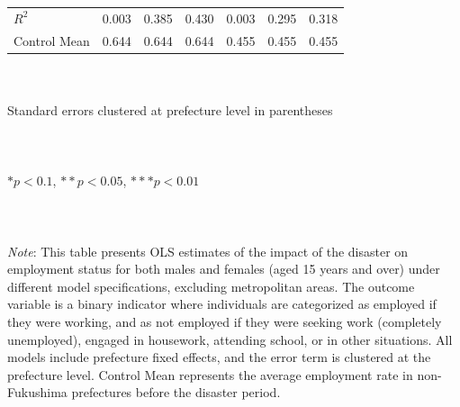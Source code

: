 \documentclass[serif, aspectratio=169]{beamer}
\newcommand{\employmentprobabilitylinks}{%
    \vfill %
    \hfill %
    {\small %
        \hyperlink{employed_placebo}{\beamerbutton{Placebo test}} \,
    }
}
\begin{document}
\begin{frame}[label=employed]
\begin{table}[htbp]
\begin{tabular}{@{}l*{6}{c}@{}}
$\textit{R}^2$&    0.003         &    0.385         &    0.430         &    0.003         &    0.295         &    0.318         \\
Control Mean&    0.644         &    0.644         &    0.644         &    0.455         &    0.455         &    0.455         \\
\bottomrule
\end{tabular}
\\\\{\linewidth}{\tiny Standard errors clustered at prefecture level in parentheses}\\\\
\\\\{\linewidth}{\tiny $*p<0.1$, $**p<0.05$, $***p<0.01$}\\\\
\\\\{\linewidth}{\tiny \textit{Note}: This table presents OLS estimates of the impact of the disaster on employment status for both males and females (aged 15 years and over) under different model specifications, excluding metropolitan areas. The outcome variable is a binary indicator where individuals are categorized as employed if they were working, and as not employed if they were seeking work (completely unemployed), engaged in housework, attending school, or in other situations. All models include prefecture fixed effects, and the error term is clustered at the prefecture level. Control Mean represents the average employment rate in non-Fukushima prefectures before the disaster period.}
\end{table}

\vspace{-2.2cm}
\employmentprobabilitylinks


\end{frame}


\end{document}
